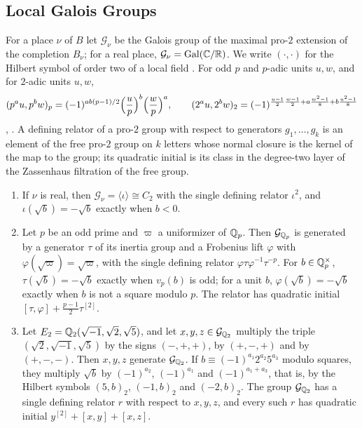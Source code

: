 \subsection{Local Galois Groups}\label{tw:local-section}
For a place $\nu$ of $B$ let $\mathcal G_\nu$ be the Galois group of the
maximal pro-$2$ extension of the completion $B_\nu$; for a real place,
$\mathcal G_\nu=\operatorname{Gal}(\mathbb C/\mathbb R)$. We write $(\cdot,\cdot)$ for the Hilbert symbol
of order two of a local field \cite[Chapter~III, Section~4]{MilneCFT}. For
odd $p$ and $p$-adic units $u,w$, and for $2$-adic units $u,w$,
\begin{equation}\label{tw:hilbert}
 (p^au,p^bw)_p=(-1)^{ab(p-1)/2}\Bigl(\frac up\Bigr)^b\Bigl(\frac wp\Bigr)^a,
 \qquad
 (2^au,2^bw)_2=(-1)^{\frac{u-1}2\frac{w-1}2+a\frac{w^2-1}8+b\frac{u^2-1}8}
\end{equation}
\cite[Chapter~III, Theorem~1]{SerreCourse}, \cite[Chapter~VIII,
Section~5]{MilneCFT}. A defining relator of a pro-$2$ group with respect to
generators $g_1,\dots,g_k$ is an element of the free pro-$2$ group on $k$
letters whose normal closure is the kernel of the map to the group; its
quadratic initial is its class in the degree-two layer of the Zassenhaus
filtration of the free group.

\begin{lemma}\label{tw:local-groups}
\begin{enumerate}
\item[(a)] If $\nu$ is real, then $\mathcal G_\nu=\langle\iota\rangle\cong C_2$
 with the single defining relator $\iota^2$, and $\iota(\sqrt b)=-\sqrt b$
 exactly when $b<0$.
\item[(b)] Let $p$ be an odd prime and $\varpi$ a uniformizer of $\mathbb Q_p$. Then
 $\mathcal G_{\mathbb Q_p}$ is generated by a generator $\tau$ of its inertia group
 and a Frobenius lift $\varphi$ with $\varphi(\sqrt\varpi)=\sqrt\varpi$, with
 the single defining relator $\varphi\tau\varphi^{-1}\tau^{-p}$. For
 $b\in\mathbb Q_p^\times$, $\tau(\sqrt b)=-\sqrt b$ exactly when $v_p(b)$ is odd;
 for a unit $b$, $\varphi(\sqrt b)=-\sqrt b$ exactly when $b$ is not a square
 modulo $p$. The relator has quadratic initial
 $[\tau,\varphi]+\frac{p-1}2\tau^{[2]}$.
\item[(c)] Let $E_2=\mathbb Q_2(\sqrt{-1},\sqrt2,\sqrt5)$, and let
 $x,y,z\in\mathcal G_{\mathbb Q_2}$ multiply the triple $(\sqrt2,\sqrt{-1},\sqrt5)$
 by the signs $(-,+,+)$, by $(+,-,+)$ and by $(+,-,-)$. Then $x,y,z$
 generate $\mathcal G_{\mathbb Q_2}$. If $b\equiv(-1)^{a_1}2^{a_2}5^{a_3}$ modulo
 squares, they multiply $\sqrt b$ by $(-1)^{a_2}$, $(-1)^{a_1}$ and
 $(-1)^{a_1+a_3}$, that is, by the Hilbert symbols $(5,b)_2$, $(-1,b)_2$ and
 $(-2,b)_2$. The group $\mathcal G_{\mathbb Q_2}$ has a single defining relator $r$
 with respect to $x,y,z$, and every such $r$ has quadratic initial
 $y^{[2]}+[x,y]+[x,z]$.
\end{enumerate}
\end{lemma}

